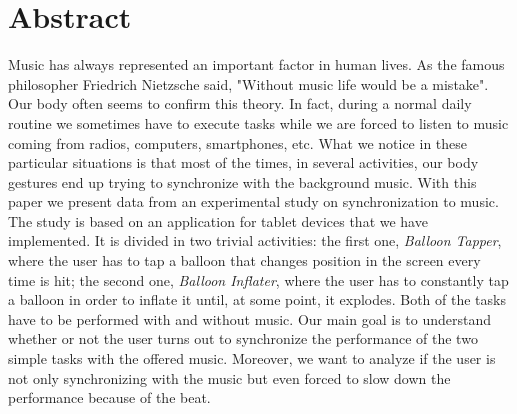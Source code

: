 \section*{Abstract}

Music has  always represented an important factor in human lives. As the famous philosopher Friedrich Nietzsche said, "Without music life would be a mistake". Our body often seems to confirm this theory. In fact, during a normal daily routine we sometimes have to execute tasks while we are forced to listen to music coming from radios, computers, smartphones, etc. What we notice in these particular situations is that most of the times, in several activities, our body gestures end up trying to synchronize with the background music. With this paper we present data from an experimental study on synchronization to music. The study is based on an application for tablet devices that we have implemented. It is divided in two trivial activities: the first one, \textit{Balloon Tapper}, where the user has to tap a balloon that changes position in the screen every time is hit; the second one, \textit{Balloon Inflater}, where the user has to constantly tap a balloon in order to inflate it until, at some point, it explodes. Both of the tasks have to be performed  with and without music. Our main goal is to understand whether or not the user turns out to synchronize the performance of the two simple tasks with the offered music. Moreover, we want to analyze if the user is not only synchronizing with the music but even forced to slow down the performance because of the beat.